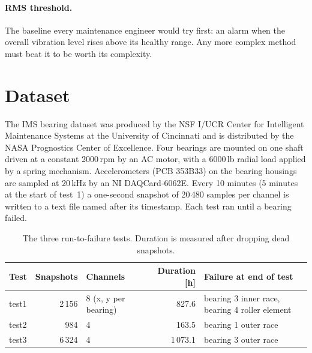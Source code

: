 \documentclass[11pt]{article}
\begin{document}
\paragraph{RMS threshold.} The baseline every maintenance engineer would try first: an alarm when the
overall vibration level rises above its healthy range. Any more complex method must beat it to be
worth its complexity.

\section{Dataset}

The IMS bearing dataset \cite{lee2007,qiu2006} was produced by the NSF I/UCR Center for Intelligent
Maintenance Systems at the University of Cincinnati and is distributed by the NASA Prognostics Center
of Excellence. Four bearings are mounted on one shaft driven at a constant 2000\,rpm by an AC motor,
with a 6000\,lb radial load applied by a spring mechanism. Accelerometers (PCB 353B33) on the bearing
housings are sampled at 20\,kHz by an NI DAQCard-6062E. Every 10 minutes (5 minutes at the start of
test~1) a one-second snapshot of 20\,480 samples per channel is written to a text file named after its
timestamp. Each test ran until a bearing failed.

\begin{table}[H]
\centering
\caption{The three run-to-failure tests. Duration is measured after dropping dead snapshots.}
\label{tab:tests}
\begin{tabularx}{\textwidth}{lrlrX}
\toprule
Test & Snapshots & Channels & Duration [h] & Failure at end of test \\
\midrule
test1 & 2\,156 & 8 (x, y per bearing) & 827.6  & bearing 3 inner race, bearing 4 roller element \\
test2 & 984    & 4                    & 163.5  & bearing 1 outer race \\
test3 & 6\,324 & 4                    & 1\,073.1 & bearing 3 outer race \\
\bottomrule
\end{tabularx}
\end{table}
\end{document}
